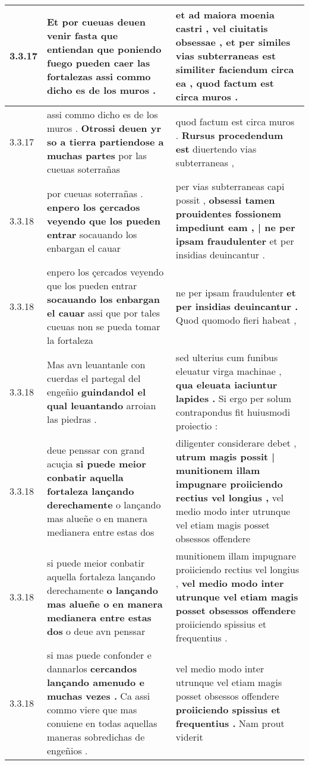 \begin{tabular}{|p{1cm}|p{6.5cm}|p{6.5cm}|}
3.3.17 & Et por cueuas deuen venir \textbf{ fasta que entiendan que poniendo fuego pueden caer las fortalezas } assi commo dicho es de los muros . & et ad maiora moenia castri , vel ciuitatis obsessae , \textbf{ et per similes vias subterraneas est similiter faciendum circa ea , } quod factum est circa muros . \\\hline
3.3.17 & assi commo dicho es de los muros . \textbf{ Otrossi deuen yr so a tierra partiendose a muchas partes } por las cueuas soterrañas & quod factum est circa muros . \textbf{ Rursus procedendum est } diuertendo vias subterraneas , \\\hline
3.3.18 & por cueuas soterrañas . \textbf{ enpero los çercados veyendo que los pueden entrar } socauando los enbargan el cauar & per vias subterraneas capi possit , \textbf{ obsessi tamen prouidentes fossionem impediunt eam , | ne per ipsam fraudulenter } et per insidias deuincantur . \\\hline
3.3.18 & enpero los çercados veyendo que los pueden entrar \textbf{ socauando los enbargan el cauar } assi que por tales cueuas non se pueda tomar la fortaleza & ne per ipsam fraudulenter \textbf{ et per insidias deuincantur . } Quod quomodo fieri habeat , \\\hline
3.3.18 & Mas avn leuantanle con cuerdas el partegal del engeñio \textbf{ guindandol el qual leuantando } arroian las piedras . & sed ulterius cum funibus eleuatur virga machinae , \textbf{ qua eleuata iaciuntur lapides . } Si ergo per solum contrapondus fit huiusmodi proiectio : \\\hline
3.3.18 & deue penssar con grand acuçia \textbf{ si puede meior conbatir aquella fortaleza lançando derechamente } o lançando mas alueñe o en manera medianera entre estas dos & diligenter considerare debet , \textbf{ utrum magis possit | munitionem illam impugnare proiiciendo rectius vel longius , } vel medio modo inter utrunque vel etiam magis posset obsessos offendere \\\hline
3.3.18 & si puede meior conbatir aquella fortaleza lançando derechamente \textbf{ o lançando mas alueñe o en manera medianera entre estas dos } o deue avn penssar & munitionem illam impugnare proiiciendo rectius vel longius , \textbf{ vel medio modo inter utrunque vel etiam magis posset obsessos offendere } proiiciendo spissius et frequentius . \\\hline
3.3.18 & si mas puede confonder e dannarlos \textbf{ cercandos lançando amenudo e muchas vezes . } Ca assi commo viere que mas conuiene en todas aquellas maneras sobredichas de engeñios . & vel medio modo inter utrunque vel etiam magis posset obsessos offendere \textbf{ proiiciendo spissius et frequentius . } Nam prout viderit \\\hline

\end{tabular}
